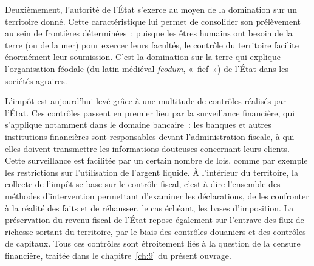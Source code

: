 Deuxièmement, l'autorité de l'État s'exerce au moyen de la domination sur un territoire donné. Cette caractéristique lui permet de consolider son prélèvement au sein de frontières déterminées~: puisque les êtres humains ont besoin de la terre (ou de la mer) pour exercer leurs facultés, le contrôle du territoire facilite énormément leur soumission. C'est la domination sur la terre qui explique l'organisation féodale (du latin médiéval \emph{feodum}, «~fief~») de l'État dans les sociétés agraires. %

L'impôt est aujourd'hui levé grâce à une multitude de contrôles réalisés par l'État. Ces contrôles passent en premier lieu par la surveillance financière, qui s'applique notamment dans le domaine bancaire~: les banques et autres institutions financières sont responsables devant l'administration fiscale, à qui elles doivent transmettre les informations douteuses concernant leurs clients. Cette surveillance est facilitée par un certain nombre de lois, comme par exemple les restrictions sur l'utilisation de l'argent liquide. À l'intérieur du territoire, la collecte de l'impôt se base sur le contrôle fiscal, c'est-à-dire l'ensemble des méthodes d'intervention permettant d'examiner les déclarations, de les confronter à la réalité des faits et de réhausser, le cas échéant, les bases d'imposition. La préservation du revenu fiscal de l'État repose également sur l'entrave des flux de richesse sortant du territoire, par le biais des contrôles douaniers et des contrôles de capitaux. Tous ces contrôles sont étroitement liés à la question de la censure financière, traitée dans le chapitre~\ref{ch:9} du présent ouvrage. %

